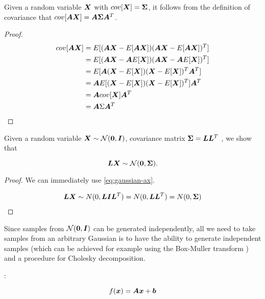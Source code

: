 \begin{thm}
    Given a random variable ${\bm{X}}$ with $cov[{\bm{X}}] = {\bm{\Sigma}}$, it follows from the definition of covariance that $cov[{\bm{A}} {\bm{X}}] = {\bm{A}} {\bm{\Sigma}} {\bm{A}}^T$.
    
    \begin{proof}
    \begin{align}
    \label{eq:gaussian-ax}
    cov[{\bm{A}} {\bm{X}}] &= E[({\bm{A}} {\bm{X}} - E[{\bm{A}} {\bm{X}}])({\bm{A}} {\bm{X}} - E[{\bm{A}} {\bm{X}}])^T] \\
    &= E[({\bm{A}} {\bm{X}} - {\bm{A}} E[{\bm{X}}])({\bm{A}} {\bm{X}} - {\bm{A}} E[{\bm{X}}])^T] \\
    &= E[{\bm{A}} ({\bm{X}} - E[{\bm{X}}])({\bm{X}} - E[{\bm{X}}])^T {\bm{A}}^T] \\
    &= {\bm{A}} E[({\bm{X}} - E[{\bm{X}}])({\bm{X}} - E[{\bm{X}}])^T] {\bm{A}}^T \\
    &= {\bm{A}} cov[{\bm{X}}] {\bm{A}}^T \\
    &= {\bm{A}} \Sigma {\bm{A}}^T
    \end{align}
    \end{proof}
\end{thm}

\begin{thm}
    Given a random variable ${\bm{X}} \sim {\mathcal{N}}({\bm{0}}, {\bm{I}})$, covariance matrix ${\bm{\Sigma}} = {\bm{L}} {\bm{L}}^T$ , we show that
    
    \begin{equation}
        {\bm{L}} {\bm{X}} \sim {\mathcal{N}}({\bm{0}}, {\bm{\Sigma}}).
    \end{equation}
    
    \begin{proof}
    We can immediately use \eqref{eq:gaussian-ax}.
    
    \begin{align}
    {\bm{L}} {\bm{X}} \sim N(0, {\bm{L}} {\bm{I}} {\bm{L}}^T) = N(0, {\bm{L}} {\bm{L}}^T) = N(0, {\bm{\Sigma}})
    \end{align}
    \end{proof}
\end{thm}

Since samples from ${\mathcal{N}}({\bm{0}}, {\bm{I}})$ can be generated independently, all we need to take samples from an arbitrary Gaussian is to have the ability to generate independent samples (which can be achieved for example using the Box-Muller transform ) and a procedure for Cholesky decomposition.

\begin{defn}
    :
    
    \begin{equation}
        f({\bm{x}}) = {\bm{A}} {\bm{x}} + {\bm{b}}
    \end{equation}
\end{defn}
    
